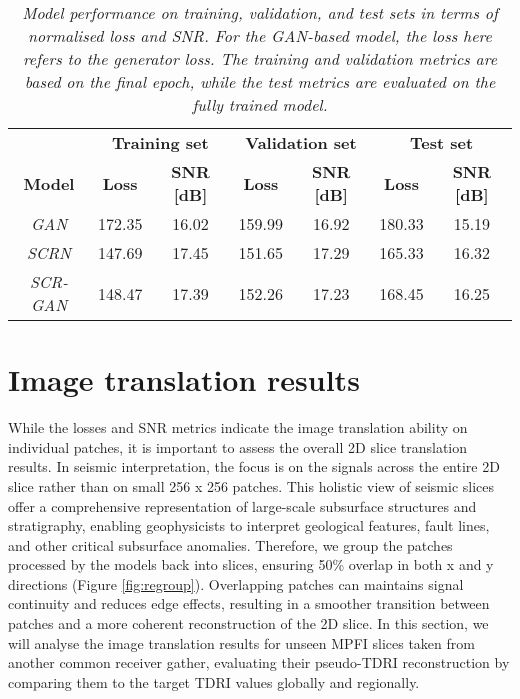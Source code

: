 \begin{table}[ht]
	\centering
	\begin{tabular}{ccccccc}
		\hline
		& \multicolumn{2}{c}{\textbf{Training set}} & \multicolumn{2}{c}{\textbf{Validation set}} & \multicolumn{2}{c}{\textbf{Test set}} \\
		\textbf{Model} & \textbf{Loss} & \textbf{SNR [dB]} & \textbf{Loss} & \textbf{SNR [dB]} & \textbf{Loss} & \textbf{SNR [dB]}\\
		\hline
		\textit{GAN} & 172.35 & 16.02 & 159.99 & 16.92 & 180.33 & 15.19\\
		\textit{SCRN} & 147.69 & 17.45 & 151.65 & 17.29 & 165.33 & 16.32\\
		\textit{SCR-GAN} & 148.47 & 17.39 & 152.26 & 17.23 & 168.45 & 16.25\\
		\hline
	\end{tabular}
	\caption{\textit{Model performance on training, validation, and test sets in terms of normalised loss and SNR. For the GAN-based model, the loss here refers to the generator loss. The training and validation metrics are based on the final epoch, while the test metrics are evaluated on the fully trained model.}}
	\label{tab:loss}
\end{table}


\section{Image translation results} \label{sec:val}
While the losses and SNR metrics indicate the image translation ability on individual patches, it is important to assess the overall 2D slice translation results. In seismic interpretation, the focus is on the signals across the entire 2D slice rather than on small 256 x 256 patches. This holistic view of seismic slices offer a comprehensive representation of large-scale subsurface structures and stratigraphy, enabling geophysicists to interpret geological features, fault lines, and other critical subsurface anomalies. Therefore, we group the patches processed by the models back into slices, ensuring 50\% overlap in both x and y directions (Figure \ref{fig:regroup}). Overlapping patches can maintains signal continuity and reduces edge effects, resulting in a smoother transition between patches and a more coherent reconstruction of the 2D slice. In this section, we will analyse the image translation results for unseen MPFI slices taken from another common receiver gather, evaluating their pseudo-TDRI reconstruction by comparing them to the target TDRI values globally and regionally.

